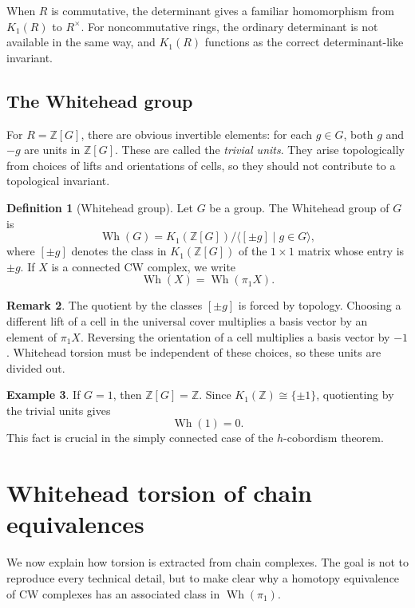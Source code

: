 \documentclass[11pt,a4paper]{article}
\newcommand{\Wh}{\operatorname{Wh}}
\newcommand{\ZZ}{\mathbb{Z}}
\theoremstyle{definition}
\newtheorem{definition}{Definition}[section]
\newtheorem{example}[definition]{Example}
\newtheorem{remark}[definition]{Remark}
\theoremstyle{plain}
\theoremstyle{remark}
\begin{document}
When \(R\) is commutative, the determinant gives a familiar homomorphism from \(K_1(R)\) to \(R^\times\). For noncommutative rings, the ordinary determinant is not available in the same way, and \(K_1(R)\) functions as the correct determinant-like invariant.

\subsection{The Whitehead group}

For \(R=\ZZ[G]\), there are obvious invertible elements: for each \(g\in G\), both \(g\) and \(-g\) are units in \(\ZZ[G]\). These are called the \emph{trivial units}. They arise topologically from choices of lifts and orientations of cells, so they should not contribute to a topological invariant.

\begin{definition}[Whitehead group]
Let \(G\) be a group. The Whitehead group of \(G\) is
\[
  \Wh(G)=K_1(\ZZ[G])\big/\langle [\pm g]\mid g\in G\rangle,
\]
where \([\pm g]\) denotes the class in \(K_1(\ZZ[G])\) of the \(1\times 1\) matrix whose entry is \(\pm g\). If \(X\) is a connected CW complex, we write
\[
  \Wh(X)=\Wh(\pi_1X).
\]
\end{definition}

\begin{remark}
The quotient by the classes \([\pm g]\) is forced by topology. Choosing a different lift of a cell in the universal cover multiplies a basis vector by an element of \(\pi_1X\). Reversing the orientation of a cell multiplies a basis vector by \(-1\). Whitehead torsion must be independent of these choices, so these units are divided out.
\end{remark}

\begin{example}
If \(G=1\), then \(\ZZ[G]=\ZZ\). Since \(K_1(\ZZ)\cong\{\pm 1\}\), quotienting by the trivial units gives
\[
  \Wh(1)=0.
\]
This fact is crucial in the simply connected case of the \(h\)-cobordism theorem.
\end{example}

\section{Whitehead torsion of chain equivalences}

We now explain how torsion is extracted from chain complexes. The goal is not to reproduce every technical detail, but to make clear why a homotopy equivalence of CW complexes has an associated class in \(\Wh(\pi_1)\).
\end{document}
